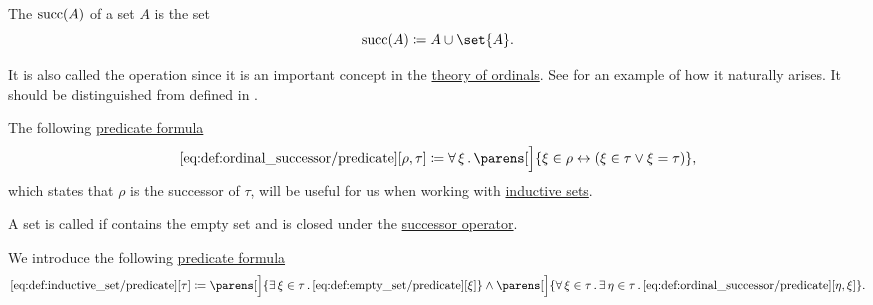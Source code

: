 \begin{definition}\label{def:ordinal_successor}
  The  \( \operatorname{succ}(A) \) of a set \( A \) is the set
  \begin{equation*}
    \op{succ}(A) \coloneqq A \cup \set{ A }.
  \end{equation*}

  It is also called the  operation since it is an important concept in the \hyperref[subsec:ordinals]{theory of ordinals}. See  for an example of how it naturally arises. It should be distinguished from  defined in .

  The following \hyperref[rem:predicate_formula]{predicate formula}
  \begin{equation*}\taglabel[\op{IsSucc}]{eq:def:ordinal_successor/predicate}
    \ref{eq:def:ordinal_successor/predicate}[\rho, \tau] \coloneqq \qforall \xi \parens[\Big]{ \xi \in \rho \leftrightarrow (\xi \in \tau \vee \xi = \tau) },
  \end{equation*}
  which states that \( \rho \) is the successor of \( \tau \), will be useful for us when working with \hyperref[def:inductive_set]{inductive sets}.
\end{definition}

\begin{definition}\label{def:inductive_set}
  A set is called  if contains the empty set and is closed under the \hyperref[def:ordinal_successor]{successor operator}.

  We introduce the following \hyperref[rem:predicate_formula]{predicate formula}
  \begin{equation*}\taglabel[\op{IsInductive}]{eq:def:inductive_set/predicate}
    \ref{eq:def:inductive_set/predicate}[\tau] \coloneqq
      \parens[\Big]{ \qexists {\xi \in \tau} \ref{eq:def:empty_set/predicate}[\xi] }
      \wedge
      \parens[\Big]{ \qforall {\xi \in \tau} \qexists {\eta \in \tau} \ref{eq:def:ordinal_successor/predicate}[\eta, \xi] }.
  \end{equation*}
\end{definition}

